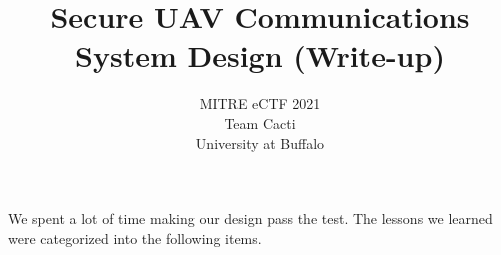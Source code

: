 \documentclass[11pt,oneside,onecolumn,letterpaper]{article}
\title{Secure UAV Communications System Design (Write-up)}
\author{MITRE eCTF 2021\\Team Cacti\\ University at Buffalo }
\date{}
\begin{document}
\normalsize


\maketitle

\renewcommand{\thepage}{System Design Write-up, Team Cacti, University at Buffalo--\arabic{page}}
\setcounter{page}{1} \normalsize
%

\newcommand{\flagRollback}{\textsf{Rollback}\xspace}



We spent a lot of time making our design pass the test.
The lessons we learned were categorized into the following items.
\end{document}
